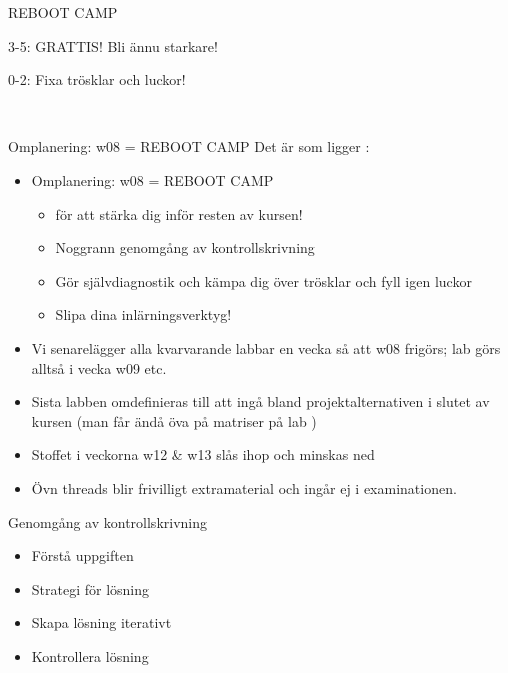 
\begin{Slide}{REBOOT CAMP}
\huge 

3-5: GRATTIS! Bli ännu starkare!

0-2: Fixa trösklar och luckor!

\vspace{0.5em}  \\\vspace{0.5em} 
\end{Slide}


\begin{Slide}{Omplanering: w08 = REBOOT CAMP}\SlideFontSmall
Det är  som ligger : \\
\begin{itemize}
\item Omplanering: w08 = REBOOT CAMP
\begin{itemize}\SlideFontTiny
\item {} för att stärka dig inför resten av kursen!
\item Noggrann genomgång av kontrollskrivning
\item Gör självdiagnostik och kämpa dig över trösklar och fyll igen luckor
\item Slipa dina inlärningsverktyg! 
\end{itemize}
\item Vi senarelägger alla kvarvarande labbar en vecka så att w08 frigörs;
 lab  görs alltså i vecka w09 etc.

\item Sista labben  omdefinieras till att ingå bland projektalternativen i slutet av kursen (man får ändå öva på matriser på lab )

\item Stoffet i veckorna w12 \& w13 slås ihop och minskas ned

\item Övn threads blir frivilligt extramaterial och ingår ej i examinationen.

\end{itemize}
\end{Slide}

\begin{Slide}{Genomgång av kontrollskrivning}
\begin{itemize}
\item Förstå uppgiften

\item Strategi för lösning

\item Skapa lösning iterativt

\item Kontrollera lösning
\end{itemize}
\end{Slide}


